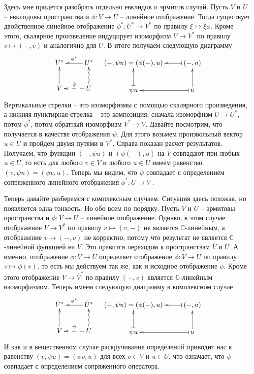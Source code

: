 Здесь мне придется разобрать отдельно евклидов и эрмитов случай.
Пусть $V$ и $U$ -- евклидовы пространства и $\phi\colon V\to U$ -- линейное отображение.
Тогда существует двойственное линейное отображение $\phi^*\colon U^*\to V^*$ по правилу $\xi \mapsto \xi \phi$.
Кроме этого, скалярное произведение индуцирует изоморфизм $V\to V^*$ по правилу $v\mapsto ({-},v)$ и  аналогично для $U$.
В итоге получаем следующую диаграмму
\[
\xymatrix{
	{V^*}&{U^*}\ar[l]_{\phi^*}\\
	{V}\ar@{~>}[u]&{U}\ar@{~>}[u]\ar@{-->}[l]_{\psi}
}
\quad
\xymatrix{
	{({-},\psi u) = (\phi({-}), u)}&{({-}, u)}\ar@{|->}[l]\\
	{\psi u}\ar@{|->}[u]&{u}\ar@{|->}[u]\ar@{|->}[l]
}
\]
Вертикальные стрелки -- это изоморфизмы с помощью скалярного произведения, а нижняя пунктирная стрелка -- это композиция: сначала изоморфизм $U\to U^*$, потом $\phi^*$, потом обратный изоморфизм $V^* \to V$.
Давайте посмотрим, что получается в качестве отображения $\psi$.
Для этого возьмем произвольный вектор $u\in U$ и пройдем двумя путями в $V^*$.
Справа показан расчет результатов.
Получаем, что функции $({-},\psi u)$ и $(\phi({-}), u)$ на $V$ совпадают при любых $u\in U$, то есть для любого $v\in V$ и любого $u\in U$ имеем равенство $(v, \psi u) = (\phi v, u)$.
Теперь мы видим, что $\psi$ совпадает с определением сопряженного линейного отображения $\phi^*\colon U\to V$ .


Теперь давайте разберемся с комплексным случаем.
Ситуация здесь похожая, но появляется одна тонкость.
Но обо всем по порядку.
Пусть $V$ и $U$ -- эрмитовы пространства и $\phi\colon V\to U$ -- линейное отображение.
Однако, в этом случае отображение $V\to V^*$ по правилу $v\mapsto (v, {-})$ не является $\mathbb C$-линейным, а отображение $v\mapsto ({-}, v)$ не корректно, потому что результат не является $\mathbb C$-линейной функцией на $V$.
Это правится переходом к пространствам $\bar V$ и $\bar U$.
А именно, отображение $\phi\colon V\to U$ определяет отображение $\bar \phi\colon \bar V\to \bar U$ по правилу $v\mapsto \phi(v)$, то есть мы действуем так же, как и исходное отображение $\phi$.
Кроме этого отображение $V\to \bar V^*$ по правилу $({-}, v)$ является $\mathbb C$-линейным изоморфизмом.
Теперь имеем следующую диаграмму в комплексном случае
\[
\xymatrix{
	{\bar V^*}&{\bar U^*}\ar[l]_{\bar \phi^*}\\
	{V}\ar@{~>}[u]&{U}\ar@{~>}[u]\ar@{-->}[l]_{\psi}
}
\quad
\xymatrix{
	{({-},\psi u) = (\phi({-}), u)}&{({-}, u)}\ar@{|->}[l]\\
	{\psi u}\ar@{|->}[u]&{u}\ar@{|->}[u]\ar@{|->}[l]
}
\]
И как и в вещественном случае раскручивание определений приводит нас к равенству $(v, \psi u) = (\phi v, u)$ для всех $v\in V$ и $u\in U$, что означает, что $\psi$ совпадает с определением сопряженного оператора.

